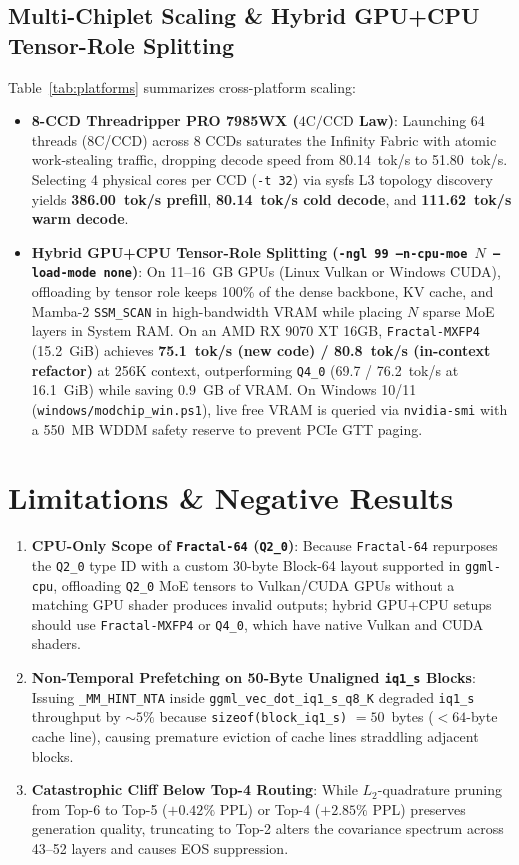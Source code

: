 \documentclass[10pt,twocolumn]{article}
\begin{document}
\subsection{Multi-Chiplet Scaling \& Hybrid GPU+CPU Tensor-Role Splitting}
Table~\ref{tab:platforms} summarizes cross-platform scaling:
\begin{itemize}
    \item \textbf{8-CCD Threadripper PRO 7985WX ($4\text{C/CCD}$ Law)}: Launching 64 threads (8C/CCD) across 8 CCDs saturates the Infinity Fabric with atomic work-stealing traffic, dropping decode speed from 80.14~tok/s to 51.80~tok/s. Selecting 4 physical cores per CCD (\texttt{-t 32}) via sysfs L3 topology discovery yields \textbf{386.00~tok/s prefill}, \textbf{80.14~tok/s cold decode}, and \textbf{111.62~tok/s warm decode}.
    \item \textbf{Hybrid GPU+CPU Tensor-Role Splitting (\texttt{-ngl 99 --n-cpu-moe $N$ --load-mode none})}: On 11--16~GB GPUs (Linux Vulkan or Windows CUDA), offloading by tensor role keeps 100\% of the dense backbone, KV cache, and Mamba-2 \texttt{SSM\_SCAN} in high-bandwidth VRAM while placing $N$ sparse MoE layers in System RAM. On an AMD RX 9070 XT 16GB, \texttt{Fractal-MXFP4} (15.2~GiB) achieves \textbf{75.1~tok/s (new code) / 80.8~tok/s (in-context refactor)} at 256K context, outperforming \texttt{Q4\_0} (69.7 / 76.2~tok/s at 16.1~GiB) while saving 0.9~GB of VRAM. On Windows 10/11 (\texttt{windows/modchip\_win.ps1}), live free VRAM is queried via \texttt{nvidia-smi} with a 550~MB WDDM safety reserve to prevent PCIe GTT paging.
\end{itemize}

\section{Limitations \& Negative Results}
\begin{enumerate}
    \item \textbf{CPU-Only Scope of \texttt{Fractal-64} (\texttt{Q2\_0})}: Because \texttt{Fractal-64} repurposes the \texttt{Q2\_0} type ID with a custom 30-byte Block-64 layout supported in \texttt{ggml-cpu}, offloading \texttt{Q2\_0} MoE tensors to Vulkan/CUDA GPUs without a matching GPU shader produces invalid outputs; hybrid GPU+CPU setups should use \texttt{Fractal-MXFP4} or \texttt{Q4\_0}, which have native Vulkan and CUDA shaders.
    \item \textbf{Non-Temporal Prefetching on 50-Byte Unaligned \texttt{iq1\_s} Blocks}: Issuing \texttt{\_MM\_HINT\_NTA} inside \texttt{ggml\_vec\_dot\_iq1\_s\_q8\_K} degraded \texttt{iq1\_s} throughput by $\sim 5\%$ because \texttt{sizeof(block\_iq1\_s)} $= 50$~bytes ($<64$-byte cache line), causing premature eviction of cache lines straddling adjacent blocks.
    \item \textbf{Catastrophic Cliff Below Top-4 Routing}: While $L_2$-quadrature pruning from Top-6 to Top-5 ($+0.42\%$ PPL) or Top-4 ($+2.85\%$ PPL) preserves generation quality, truncating to Top-2 alters the covariance spectrum across 43--52 layers and causes EOS suppression.
\end{enumerate}
\end{document}
